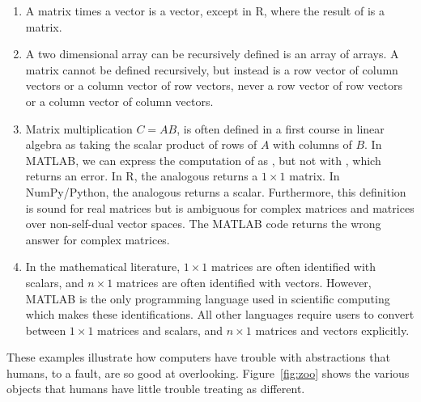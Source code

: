 \begin{enumerate}
\item
A matrix times a vector is a vector, except in R, where the result of  is a matrix.

\item
A two dimensional array can be recursively defined is an array of arrays. A matrix cannot be defined recursively, but instead is a row vector of column vectors or a column vector of row vectors, never a row vector of row vectors or a column vector of column vectors.

\item
Matrix multiplication $C=AB$, is often defined in a first course in linear algebra as taking the scalar product of rows of $A$ with columns of $B$.
In MATLAB, we can express the computation of  as , but not with , which returns an error.
In R, the analogous  returns a $1\times1$ matrix.
In NumPy/Python, the analogous  returns a scalar.
Furthermore, this definition is sound for real matrices but is ambiguous for complex matrices and matrices over non-self-dual vector spaces.
The MATLAB code  returns the wrong answer for complex matrices.

\item
In the mathematical literature, $1\times 1$ matrices are often identified with scalars, and $n\times 1$ matrices are often identified with vectors. However, MATLAB is the only programming language used in scientific computing which makes these identifications. All other languages require users to convert between $1\times 1$ matrices and scalars, and $n\times 1$ matrices and vectors explicitly.

\end{enumerate}


These examples illustrate how computers have trouble with abstractions that humans, to a fault, are so good at overlooking. Figure~\ref{fig:zoo} shows the various objects that humans have little trouble treating as different.

